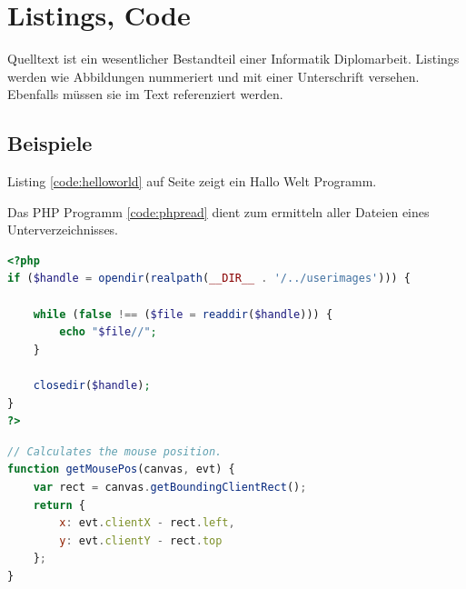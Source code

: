 
\section*{Listings, Code}

Quelltext ist ein wesentlicher Bestandteil einer Informatik Diplomarbeit.
Listings werden wie Abbildungen nummeriert und mit einer Unterschrift versehen.
Ebenfalls müssen sie im Text referenziert werden.

\subsection*{Beispiele}

Listing \ref{code:helloworld} auf Seite \pageref{code:helloworld} zeigt ein Hallo Welt Programm.


\begin{minipage}{\linewidth}

\end{minipage}


Das PHP Programm \ref{code:phpread} dient zum ermitteln aller Dateien eines Unterverzeichnisses.

\begin{lstlisting}[language=PHP,caption={Alle Dateinamen ausgeben.},label=code:phpread]
<?php
if ($handle = opendir(realpath(__DIR__ . '/../userimages'))) {
    
    while (false !== ($file = readdir($handle))) {
        echo "$file//";
    }

    closedir($handle);
}
?>
\end{lstlisting}

\begin{lstlisting}[language=JavaScript,caption={Mausposition ermitteln.}]
// Calculates the mouse position.
function getMousePos(canvas, evt) {
	var rect = canvas.getBoundingClientRect();
	return {
		x: evt.clientX - rect.left,
		y: evt.clientY - rect.top
	};
}
\end{lstlisting}















